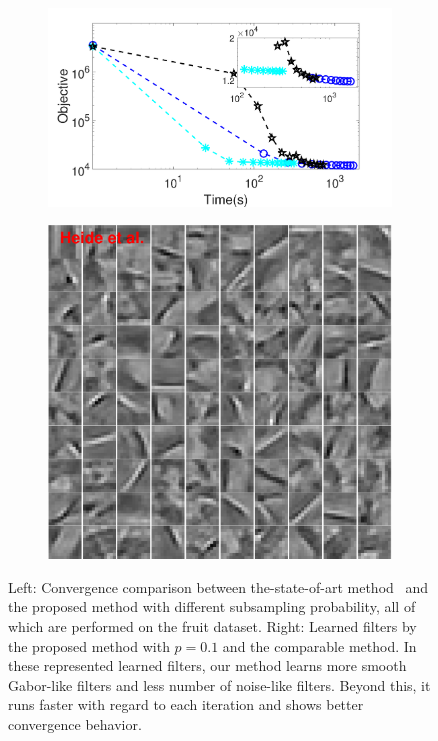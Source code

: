 \begin{figure}[h]
\begin{subfigure}{0.6\textwidth}
  \includegraphics[width=1\linewidth]{figure/timeVSobj.pdf}
\end{subfigure}
\begin{subfigure}{0.3\textwidth}
  \includegraphics[width=1\linewidth]{figure/heideFruit100.pdf}
\end{subfigure}

\caption{Left: Convergence comparison between the-state-of-art method~\cite{heide2015fast} and the proposed method with different subsampling probability, all of which are performed on the fruit dataset. Right: Learned filters by the proposed method with $p=0.1$ and the comparable method. In these represented learned filters, our method learns more smooth Gabor-like filters and less number of noise-like filters. Beyond this, it runs faster with regard to each iteration and shows better convergence behavior.}
\label{fig:subsampleResult}
\end{figure}


